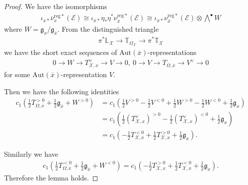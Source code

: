 \documentclass [11pt,oneside,a4paper,mathscr]{amsart}
\theoremstyle{definition}
\newcommand{\ox}{\overline{x}}
\newcommand{\X}{\mathcal{X}}
\begin{document}
\begin{proof}
    We have the isomorphisms 
    \begin{align*}
\iota_{x\ast}\overline{\nu}_x^{\mathrm{reg}\ast}(\mathcal{E}) \cong 
\iota_{\overline{x}\ast}\eta_{\ast}\eta^{\ast}\nu_{\ox}^{\mathrm{reg}\ast}(\mathcal{E}) 
\cong \iota_{\overline{x}\ast}\nu_{\ox}^{\mathrm{reg}\ast}(\mathcal{E}) \otimes \bigwedge^{\bullet}W
    \end{align*}
    where $W=\mathfrak{g}_{x}/\mathfrak{g}_{\ox}$. 
    From the distinguished triangle 
    \begin{align*}
        \pi^{\ast}\mathbb{L}_{\X} \to \mathbb{T}_{\Omega_{\X}} \to \pi^{\ast}
        \mathbb{T}_{\X}
    \end{align*}
    we have the short exact sequences of $\mathrm{Aut}(\ox)$-representations
    \begin{align*}%
    0 \to W \to T_{\X, x}^{\vee} \to V \to 0, \ 
    0 \to V \to T_{\Omega, \ox} \to V^{\vee} \to 0
    \end{align*}
    for some $\mathrm{Aut}(\ox)$-representation $V$. 
    
    Then we have the following identities
    \begin{align*}
        c_1\left(\frac{1}{2}T_{\Omega, \ox}^{>0}+\frac{1}{2}\mathfrak{g}_{\ox}+W^{>0}\right) &=c_1\left(
        \frac{1}{2}V^{>0}-\frac{1}{2}V^{<0}+\frac{1}{2}W^{>0}-\frac{1}{2}W^{<0}+\frac{1}{2}\mathfrak{g}_x\right) \\
        &=c_1\left(\frac{1}{2}(T_{\X, x}^{\vee})^{>0}-\frac{1}{2}(T_{\X, x}^{\vee})^{<0}+\frac{1}{2}\mathfrak{g}_x\right) \\
        &=c_1\left(-\frac{1}{2}T_{\X, x}^{<0}+\frac{1}{2}T_{\X, x}^{>0}+\frac{1}{2}\mathfrak{g}_x\right). 
    \end{align*}
    
    Similarly we have 
    \begin{align*}
        c_1\left(\frac{1}{2}T_{\Omega, \ox}^{<0}+\frac{1}{2}\mathfrak{g}_{\ox}+W^{<0}\right)
        =c_1\left(-\frac{1}{2}T_{\X, x}^{>0}+\frac{1}{2}T_{\X, x}^{<0}+\frac{1}{2}\mathfrak{g}_x\right).
    \end{align*}
    Therefore the lemma holds. 
\end{proof}
\end{document}
